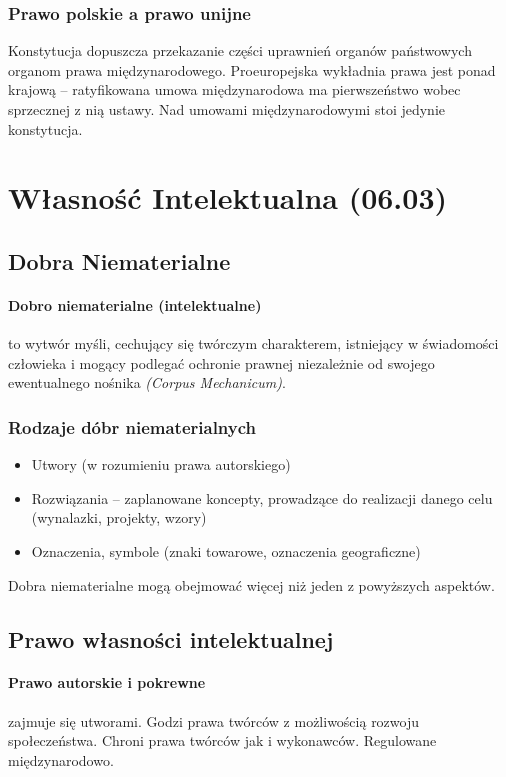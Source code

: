 \documentclass{article}
\begin{document}
\subsubsection{Prawo polskie a prawo unijne}
Konstytucja dopuszcza przekazanie części uprawnień organów państwowych organom prawa międzynarodowego.
Proeuropejska wykładnia prawa jest ponad krajową --
ratyfikowana umowa międzynarodowa ma pierwszeństwo wobec sprzecznej z nią ustawy.
Nad umowami międzynarodowymi stoi jedynie konstytucja.


\section{Własność Intelektualna (06.03)}

\subsection{Dobra Niematerialne}

\paragraph{Dobro niematerialne (intelektualne)}
to wytwór myśli, cechujący się twórczym charakterem, istniejący w świadomości człowieka
i mogący podlegać ochronie prawnej niezależnie od swojego ewentualnego nośnika \textit{(Corpus Mechanicum)}.

\subsubsection{Rodzaje dóbr niematerialnych}
\begin{itemize}
  \item Utwory (w rozumieniu prawa autorskiego)
  \item Rozwiązania -- zaplanowane koncepty, prowadzące do realizacji danego celu (wynalazki, projekty, wzory)
  \item Oznaczenia, symbole (znaki towarowe, oznaczenia geograficzne)
\end{itemize}

Dobra niematerialne mogą obejmować więcej niż jeden z powyższych aspektów.

\subsection{Prawo własności intelektualnej}

\paragraph{Prawo autorskie i pokrewne}
zajmuje się utworami. Godzi prawa twórców z możliwością rozwoju społeczeństwa. Chroni prawa twórców jak i wykonawców. Regulowane międzynarodowo.
\end{document}
